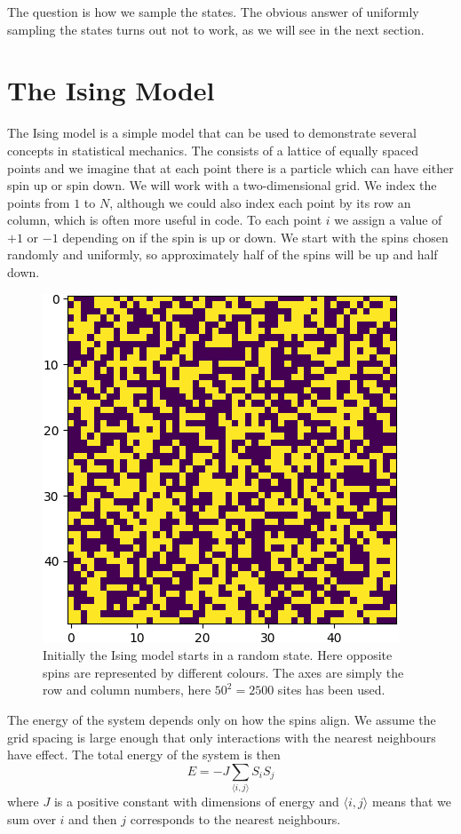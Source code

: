 \documentclass[fleqn]{NotesClass}
\begin{document}
    The question is how we sample the states.
    The obvious answer of uniformly sampling the states turns out not to work, as we will see in the next section.
    
    \section{The Ising Model}
    The Ising model is a simple model that can be used to demonstrate several concepts in statistical mechanics.
    The  consists of a lattice of equally spaced points and we imagine that at each point there is a particle which can have either spin up or spin down.
    We will work with a two-dimensional grid.
    We index the points from \(1\) to \(N\), although we could also index each point by its row an column, which is often more useful in code.
    To each point \(i\) we assign a value of \(+1\) or \(-1\) depending on if the spin is up or down.
    We start with the spins chosen randomly and uniformly, so approximately half of the spins will be up and half down.
    
    \begin{figure}
        \includegraphics[height=0.3\textheight]{images/ising-random-start}
        \caption[Random Ising Model Start]{Initially the Ising model starts in a random state. Here opposite spins are represented by different colours. The axes are simply the row and column numbers, here \(50^2 = 2500\) sites has been used.}
    \end{figure}
    
    The energy of the system depends only on how the spins align.
    We assume the grid spacing is large enough that only interactions with the nearest neighbours have effect.
    The total energy of the system is then
    \begin{equation}
        E = -J\sum_{\langle i, j \rangle} S_iS_j
    \end{equation}
    where \(J\) is a positive constant with dimensions of energy and \(\langle i, j \rangle\) means that we sum over \(i\) and then \(j\) corresponds to the nearest neighbours.
    
\end{document}
